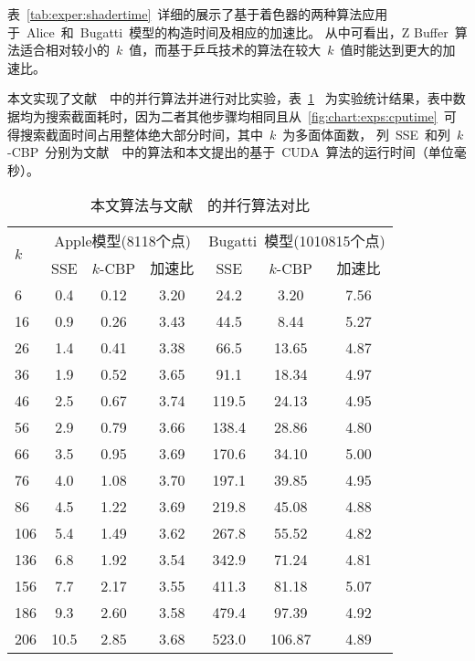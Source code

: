 表~\ref{tab:exper:shadertime}~详细的展示了基于着色器的两种算法应用于~Alice~和~Bugatti~模型的构造时间及相应的加速比。
从中可看出，Z Buffer~算法适合相对较小的~$k$~值，而基于乒乓技术的算法在较大~$k$~值时能达到更大的加速比。

本文实现了文献~~中的并行算法并进行对比实验，表~\ref{tab:exp:sse-time}
~为实验统计结果，表中数据均为搜索截面耗时，因为二者其他步骤均相同且从~\ref{fig:chart:exps:cputime}~可得搜索截面时间占用整体绝大部分时间，其中~$k$~为多面体面数，
列~SSE~和列~$k$-CBP~分别为文献~~中的算法和本文提出的基于~CUDA~算法的运行时间（单位毫秒）。

\begin{table}[htbp] 
\centering
\caption{本文算法与文献~~的并行算法对比}
\begin{tabular}{p{1.5cm}<{\centering}ccc ccc} %
\toprule[1.5pt]
\multirow{2}{*}{$k$} & \multicolumn{3}{c}{Apple模型(8118个点)} &
\multicolumn{3}{c}{Bugatti~模型(1010815个点)}\\
\cmidrule(lr){2-4}\cmidrule(lr){5-7}
~&SSE\cite{karlsson2010parallel} & $k$-CBP &  加速比 & SSE & $k$-CBP &  加速比\\
\midrule[1pt]
6 & 0.4 & 0.12  & 3.20     & 24.2 & 3.20  & 7.56 \\
16 & 0.9 & 0.26  & 3.43    & 44.5 & 8.44  & 5.27 \\
26 & 1.4 & 0.41  & 3.38    & 66.5 & 13.65  & 4.87 \\
36 & 1.9 & 0.52  & 3.65    & 91.1 & 18.34  & 4.97 \\
46 & 2.5 & 0.67  & 3.74    & 119.5 & 24.13  & 4.95 \\
56 & 2.9 & 0.79  & 3.66    & 138.4 & 28.86  & 4.80 \\
66 & 3.5 & 0.95  & 3.69    & 170.6 & 34.10  & 5.00 \\
76 & 4.0 & 1.08  & 3.70    & 197.1 & 39.85  & 4.95 \\
86 & 4.5 & 1.22  & 3.69    & 219.8 & 45.08  & 4.88 \\
106 & 5.4 & 1.49  & 3.62   & 267.8 & 55.52  & 4.82 \\
136 &  6.8 & 1.92  & 3.54  & 342.9 & 71.24  & 4.81 \\
156 &  7.7 & 2.17  & 3.55  & 411.3 & 81.18  & 5.07 \\
186 &  9.3 & 2.60  & 3.58  & 479.4 & 97.39  & 4.92 \\
206 &  10.5 & 2.85  & 3.68 & 523.0 & 106.87  & 4.89  \\  
\bottomrule[1.5pt]
\end{tabular}
\label{tab:exp:sse-time}
\end{table}

